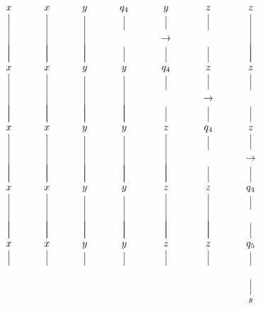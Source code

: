 \documentclass[../main.tex]{subfiles}
\begin{document}
\[\begin{tikzcd}
    x \arrow[no head]{dd}{} & x \arrow[no head]{dd}{} & y \arrow[no head]{dd}{} & q_4 \arrow[no head, shorten >=7pt]{d}{} & y \arrow[no head, shorten >=4pt]{d}{} & z \arrow[no head, shorten >=7pt]{d}{} & z \arrow[no head]{dd}{} \\
    \ \arrow[no head]{d}{} & \ \arrow[no head]{d}{} & \arrow[no head]{d}{} & |[alias=I1]| \arrow[no head, shorten <=2pt]{d}{} & |[alias=I2]| \rightarrow  \arrow[no head, shorten <=2pt]{d}{} & |[alias=I3]|  \arrow[no head, shorten <=2pt]{d}{} & \ \arrow[no head]{d}{} \\
    x \arrow[no head]{dd}{} & x \arrow[no head]{dd}{} & y \arrow[no head]{dd}{} & y \arrow[no head]{dd}{} & q_4 \arrow[no head, shorten >=7pt]{d}{} & z \arrow[no head, shorten >=4pt]{d}{} & z \arrow[no head, shorten >=7pt]{d}{} \\
    \ \arrow[no head]{d}{} & \ \arrow[no head]{d}{} & \arrow[no head]{d}{} & \arrow[no head]{d}{} & |[alias=J1]| \arrow[no head, shorten <=2pt]{d}{} & |[alias=J2]| \rightarrow  \arrow[no head, shorten <=2pt]{d}{} & |[alias=J3]|  \arrow[no head, shorten <=2pt]{d}{} \\
    x \arrow[no head]{dd}{} & x \arrow[no head]{dd}{} & y \arrow[no head]{dd}{} & y \arrow[no head]{dd}{} & z \arrow[no head]{dd}{} & q_4 \arrow[no head, shorten >=7pt]{d}{} & z \arrow[no head, shorten >=4pt]{d}{} \\
    \ \arrow[no head]{d}{} & \ \arrow[no head]{d}{} & \arrow[no head]{d}{} & \arrow[no head]{d}{} & \arrow[no head]{d}{} & |[alias=K1]| \arrow[no head, shorten <=2pt]{d}{} & |[alias=K2]| \rightarrow  \arrow[no head, shorten <=2pt]{d}{} \\
    x \arrow[no head]{dd}{} & x \arrow[no head]{dd}{} & y \arrow[no head]{dd}{} & y \arrow[no head]{dd}{} & z \arrow[no head]{dd}{} & z \arrow[no head]{dd}{} & q_4 \arrow[no head, shorten >=4pt]{d}{} \\
    \ \arrow[no head]{d}{} & \ \arrow[no head]{d}{} & \arrow[no head]{d}{} & \arrow[no head]{d}{} & \arrow[no head]{d}{} & \arrow[no head]{d}{} & |[alias=L1]| \arrow[no head, shorten <=2pt]{d}{} \\
    x \arrow[no head, shorten >=4pt]{d}{}  & x \arrow[no head, shorten >=4pt]{d}{}  & y \arrow[no head, shorten >=4pt]{d}{}  & y \arrow[no head, shorten >=4pt]{d}{} & z \arrow[no head, shorten >=4pt]{d}{} & z \arrow[no head, shorten >=4pt]{d}{} & q_5 \arrow[no head, shorten >=4pt]{d}{}  \\
    |[alias=M1]| & \ & \ & \ & \ & \ & |[alias=M2]| \ \arrow[no head, shorten <=2pt]{d}{} \\
    \ & \ & \ & \ & \ & \ & s
\end{tikzcd}
\]
\end{document}
